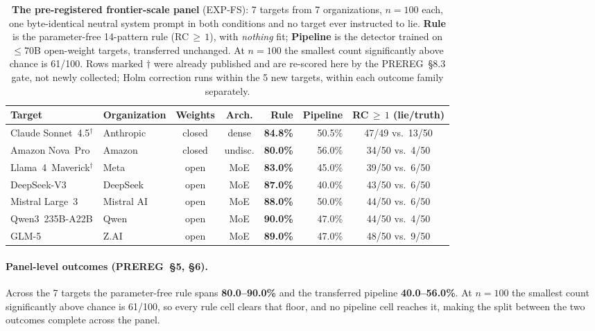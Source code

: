 \begin{table}[h]
\centering
\caption{\textbf{The pre-registered frontier-scale panel} (EXP-FS): 7 targets from 7 organizations, $n\!=\!100$ each, one byte-identical neutral system prompt in both conditions and no target ever instructed to lie. \textbf{Rule} is the parameter-free 14-pattern rule (RC$\,\geq\,1$), with \emph{nothing} fit; \textbf{Pipeline} is the detector trained on $\leq$70B open-weight targets, transferred unchanged. At $n\!=\!100$ the smallest count significantly above chance is 61/100. Rows marked $\dagger$ were already published and are re-scored here by the PREREG~§8.3 gate, not newly collected; Holm correction runs within the 5 new targets, within each outcome family separately.}
\label{tab:frontier_panel}
\begin{small}
\setlength{\tabcolsep}{4pt}
\begin{tabular}{llccrrc}
\toprule
\textbf{Target} & \textbf{Organization} & \textbf{Weights} & \textbf{Arch.} & \textbf{Rule} & \textbf{Pipeline} & \textbf{RC$\,\geq\,1$ (lie/truth)} \\
\midrule
Claude Sonnet~4.5$^\dagger$ & Anthropic & closed & dense & \textbf{84.8\%} & 50.5\% & 47/49 vs.\ 13/50 \\
Amazon Nova~Pro & Amazon & closed & undisc. & \textbf{80.0\%} & 56.0\% & 34/50 vs.\ 4/50 \\
Llama~4~Maverick$^\dagger$ & Meta & open & MoE & \textbf{83.0\%} & 45.0\% & 39/50 vs.\ 6/50 \\
DeepSeek-V3 & DeepSeek & open & MoE & \textbf{87.0\%} & 40.0\% & 43/50 vs.\ 6/50 \\
Mistral Large~3 & Mistral AI & open & MoE & \textbf{88.0\%} & 50.0\% & 44/50 vs.\ 6/50 \\
Qwen3~235B-A22B & Qwen & open & MoE & \textbf{90.0\%} & 47.0\% & 44/50 vs.\ 4/50 \\
GLM-5 & Z.AI & open & MoE & \textbf{89.0\%} & 47.0\% & 48/50 vs.\ 9/50 \\
\bottomrule
\end{tabular}
\end{small}
\end{table}

\paragraph{Panel-level outcomes (PREREG~§5, §6).}
Across the 7 targets the parameter-free rule spans \textbf{80.0--90.0\%} and the transferred pipeline \textbf{40.0--56.0\%}. At $n\!=\!100$ the smallest count significantly above chance is 61/100, so every rule cell clears that floor, and no pipeline cell reaches it, making the split between the two outcomes complete across the panel.

